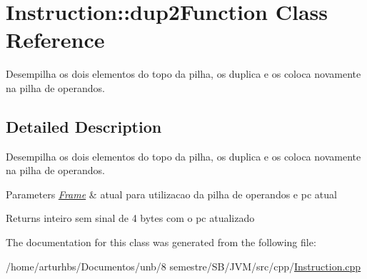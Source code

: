 \hypertarget{classInstruction_1_1dup2Function}{}\section{Instruction\+:\+:dup2\+Function Class Reference}
\label{classInstruction_1_1dup2Function}


Desempilha os dois elementos do topo da pilha, os duplica e os coloca novamente na pilha de operandos.  




\subsection{Detailed Description}
Desempilha os dois elementos do topo da pilha, os duplica e os coloca novamente na pilha de operandos. 


\begin{DoxyParams}{Parameters}
{\em \hyperlink{classFrame}{Frame}} & atual para utilizacao da pilha de operandos e pc atual \\
\hline
\end{DoxyParams}
\begin{DoxyReturn}{Returns}
inteiro sem sinal de 4 bytes com o pc atualizado 
\end{DoxyReturn}


The documentation for this class was generated from the following file\+:\begin{DoxyCompactItemize}
\item 
/home/arturhbs/\+Documentos/unb/8 semestre/\+S\+B/\+J\+V\+M/src/cpp/\hyperlink{Instruction_8cpp}{Instruction.\+cpp}\end{DoxyCompactItemize}
